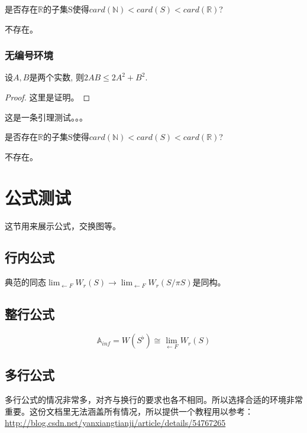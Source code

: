\begin{problem}[连续统假设]是否存在$\mathbb{R}$的子集S使得$card(\mathbb{N})<card(S)<card(\mathbb{R})$?
\end{problem}
\begin{solution}
    不存在。
\end{solution}

\subsubsection{无编号环境}

\begin{theorem*}

    设$A,B$是两个实数, 则$2AB\leq 2 A^2+B^2$.
    
\end{theorem*}

\begin{proof}
    这里是证明。
\end{proof}

\begin{lemma*}[Nakayama引理]
    这是一条引理测试。。。
\end{lemma*}

\begin{problem*}[连续统假设]是否存在$\mathbb{R}$的子集S使得$card(\mathbb{N})<card(S)<card(\mathbb{R})$?
\end{problem*}
\begin{solution}
    不存在。
\end{solution}

\section{公式测试}这节用来展示公式，交换图等。
 
\subsection{行内公式}
典范的同态$\lim_{\leftarrow F} W_r(S)\rightarrow \lim_{\leftarrow F} W_r(S/\pi S )$是同构。

\subsection{整行公式}
$$\mathbb{A}_{inf}=W(S^\flat)\cong \lim_{\leftarrow F} W_r(S)$$

\subsection{多行公式}
\begin{sloppypar}
多行公式的情况非常多，对齐与换行的要求也各不相同。所以选择合适的环境非常重要。这份文档里无法涵盖所有情况，所以提供一个教程用以参考：\url{http://blog.csdn.net/yanxiangtianji/article/details/54767265}
\end{sloppypar}



